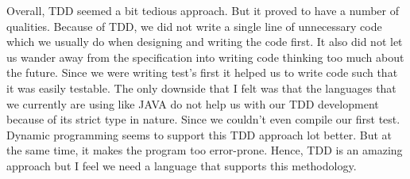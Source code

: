 Overall, TDD seemed a bit tedious approach. But it proved to have a number of qualities. Because of TDD, we did not write a single line of unnecessary code which we usually do when designing and writing the code first. It also did not let us wander away from the specification into writing code thinking too much about the future. Since we were writing test's first it helped us to write code such that it was easily testable. The only downside that I felt was that the languages that we currently are using like JAVA do not help us with our TDD development because of its strict type in nature. Since we couldn't even compile our first test. Dynamic programming seems to support this TDD approach lot better. But at the same time, it makes the program too error-prone. Hence, TDD is an amazing approach but I feel we need a language that supports this methodology.
